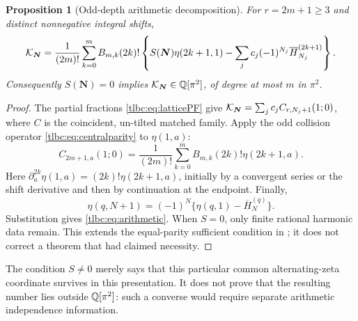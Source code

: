 \documentclass[11pt,letterpaper]{article}
\numberwithin{equation}{section}
\newtheorem{proposition}[theorem]{Proposition}
\theoremstyle{definition}\newtheorem{definition}[theorem]{Definition}
\theoremstyle{remark}\newtheorem{remark}[theorem]{Remark}
\begin{document}
\begin{proposition}[Odd-depth arithmetic decomposition]\label{tlbc:prop:arithmetic}
For $r=2m+1\ge3$ and distinct nonnegative integral shifts,
\begin{equation}\label{tlbc:eq:arithmetic}
 \mathcal K_{\boldsymbol N}
 =\frac1{(2m)!}\sum_{k=0}^m B_{m,k}(2k)!
 \left\{S(\boldsymbol N)\eta(2k+1,1)
       -\sum_jc_j(-1)^{N_j}\overline H_{N_j}^{(2k+1)}\right\}.
\end{equation}
Consequently $S(\boldsymbol N)=0$ implies
$\mathcal K_{\boldsymbol N}\in\mathbb Q[\pi^2]$, of degree at most $m$ in $\pi^2$.
\end{proposition}
\begin{proof}
The partial fractions \eqref{tlbc:eq:latticePF} give
$\mathcal K_{\boldsymbol N}=\sum_jc_j C_{r,N_j+1}(1;0)$, where $C$ is the coincident, un-tilted matched family. Apply the odd collision operator \eqref{tlbc:eq:centralparity} to $\eta(1,a)$:
\[
 C_{2m+1,a}(1;0)
 =\frac1{(2m)!}\sum_{k=0}^mB_{m,k}(2k)!\eta(2k+1,a).
\]
Here $\partial_a^{2k}\eta(1,a)=(2k)!\eta(2k+1,a)$, initially by a convergent series or the shift derivative and then by continuation at the endpoint. Finally,
\[
 \eta(q,N+1)=(-1)^N\{\eta(q,1)-\overline H_N^{(q)}\}.
\]
Substitution gives \eqref{tlbc:eq:arithmetic}. When $S=0$, only finite rational harmonic data remain. This extends the equal-parity sufficient condition in \cite{RLC}; it does not correct a theorem that had claimed necessity.
\end{proof}

The condition $S\ne0$ merely says that this particular common alternating-zeta coordinate survives in this presentation. It does not prove that the resulting number lies outside $\mathbb Q[\pi^2]$: such a converse would require separate arithmetic independence information.
\end{document}
